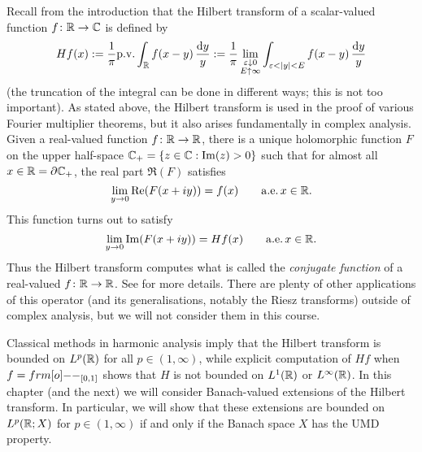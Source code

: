 Recall from the introduction that the Hilbert transform of a scalar-valued function $f \colon \mathbb{R} \rightarrow \mathbb{C}$ is defined by
\begin{equation*}
  Hf(x) := \frac{1}{\pi} \mathrm{p. v.} \int_{\mathbb{R}} f(x-y) \, \frac{\mathrm{d} y}{y} := \frac{1}{\pi} \lim_{\substack{\varepsilon \downarrow 0 \\ E \uparrow \infty}} \int_{\varepsilon < |y| < E} f(x-y) \, \frac{\mathrm{d} y}{y}
\end{equation*}
(the truncation of the integral can be done in different ways; this is not too important).
As stated above, the Hilbert transform is used in the proof of various Fourier multiplier theorems, but it also arises fundamentally in complex analysis.
Given a real-valued function $f \colon \mathbb{R} \rightarrow \mathbb{R}$, there is a unique holomorphic function $F$ on the upper half-space $\mathbb{C}_{+} = \{z \in \mathbb{C} : \mathrm{Im}(z) > 0\}$ such that for almost all $x \in \mathbb{R} = \partial \mathbb{C}_{+}$, the real part $\Re(F)$ satisfies
\begin{equation*}
  \lim_{y \to 0} \mathrm{Re}(F(x+iy)) = f(x) \qquad \mathrm{a.e.} \,  x \in \mathbb{R}.
\end{equation*}
This function turns out to satisfy
\begin{equation*}
  \lim_{y \to 0} \mathrm{Im}(F(x+iy)) = Hf(x)  \qquad \mathrm{a.e.} \,  x \in \mathbb{R}.
\end{equation*}
Thus the Hilbert transform computes what is called the \emph{conjugate function} of a real-valued $f \colon \mathbb{R} \rightarrow \mathbb{R}$.
See \cite[.2]{grafakos} for more details.
There are plenty of other applications of this operator (and its generalisations, notably the Riesz transforms) outside of complex analysis, but we will not consider them in this course.

Classical methods in harmonic analysis imply that the Hilbert transform is bounded on $L^p(\mathbb{R})$ for all $p \in (1,\infty)$, while explicit computation of $Hf$ when $f = \1_{[0,1]}$ shows that $H$ is not bounded on $L^1(\mathbb{R})$ or $L^\infty(\mathbb{R})$.
In this chapter (and the next) we will consider Banach-valued extensions of the Hilbert transform.
In particular, we will show that these extensions are bounded on $L^p(\mathbb{R};X)$ for $p \in (1,\infty)$ if and only if the Banach space $X$ has the UMD property.

